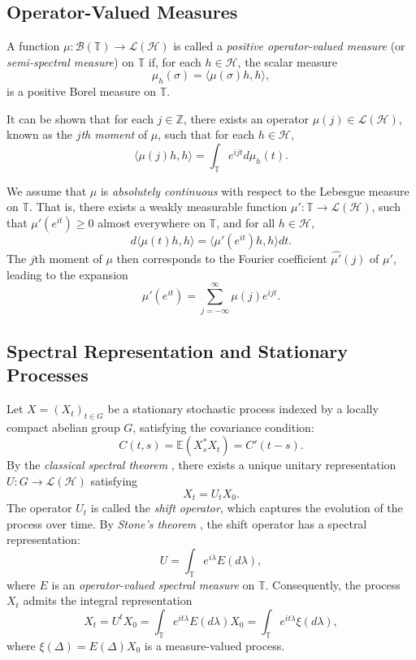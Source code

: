 \documentclass[11pt]{article}
\begin{document}
\subsection{Operator-Valued Measures}

A function $\mu: \mathcal{B}(\mathbb{T}) \to \mathcal{L}(\mathcal{H})$ is called a \textit{positive operator-valued measure} (or \textit{semi-spectral measure}) on $\mathbb{T}$ if, for each $ h \in \mathcal{H}$, the scalar measure
\[
\mu_h(\sigma) = \langle \mu(\sigma) h, h \rangle,
\]
is a positive Borel measure on $\mathbb{T}$.

It can be shown that for each $ j \in \mathbb{Z}$, there exists an operator $ \mu(j) \in \mathcal{L}(\mathcal{H}) $, known as the \textit{$j$th moment} of $\mu$, such that for each $ h \in \mathcal{H}$,
\[
\langle \mu(j) h, h \rangle = \int_{\mathbb{T}} e^{i j t} d\mu_h(t).
\]

We assume that $ \mu $ is \textit{absolutely continuous} with respect to the Lebesgue measure on $\mathbb{T}$. That is, there exists a weakly measurable function $ \mu' : \mathbb{T} \to \mathcal{L}(\mathcal{H}) $, such that $ \mu'(e^{it}) \geq 0 $ almost everywhere on $\mathbb{T}$, and for all $ h \in \mathcal{H} $,
\[
 d \langle \mu(t) h, h \rangle = \langle \mu'(e^{it}) h, h \rangle dt.
\]
The $ j $th moment of $ \mu $ then corresponds to the Fourier coefficient $ \widehat{\mu'}(j) $ of $ \mu' $, leading to the expansion
\[
 \mu'(e^{it}) = \sum_{j=-\infty}^{\infty} \mu(j) e^{ijt}.
\]

\subsection{Spectral Representation and Stationary Processes}

Let $ X = (X_t)_{t \in G} $ be a stationary stochastic process indexed by a locally compact abelian group $ G $, satisfying the covariance condition:
\[
 C(t, s) = \mathbb{E}(X_s^* X_t) = C'(t - s).
\]
By the \textit{classical spectral theorem} \cite{DunSa}, there exists a unique unitary representation $ U : G \to \mathcal{L}(\mathcal{H}) $ satisfying
\[
 X_t = U_t X_0.
\]
The operator $ U_t $ is called the \textit{shift operator}, which captures the evolution of the process over time. By \textit{Stone’s theorem} \cite{Sto}, the shift operator has a spectral representation:
\[
 U = \int_{\mathbb{T}} e^{i\lambda} E(d\lambda),
\]
where $ E $ is an \textit{operator-valued spectral measure} on $\mathbb{T}$. Consequently, the process $ X_t $ admits the integral representation
\[
 X_t = U^t X_0 = \int_{\mathbb{T}} e^{it\lambda} E(d\lambda) X_0 = \int_{\mathbb{T}} e^{it\lambda} \xi(d\lambda),
\]
where $ \xi(\Delta) = E(\Delta) X_0 $ is a measure-valued process.
\end{document}
